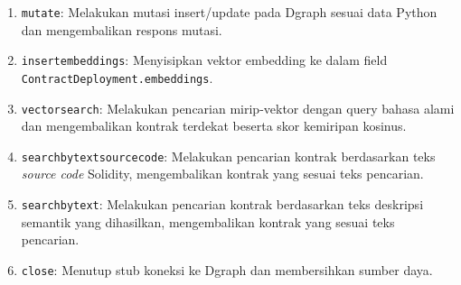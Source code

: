 \begin{enumerate}
	\item \texttt{mutate}: Melakukan mutasi insert/update pada Dgraph sesuai data Python dan mengembalikan respons mutasi.
	\item \texttt{insert\textunderscore embeddings}: Menyisipkan vektor embedding ke dalam field \\\texttt{ContractDeployment.embeddings}.
	\item \texttt{vector\textunderscore search}: Melakukan pencarian mirip-vektor dengan query bahasa alami dan mengembalikan kontrak terdekat beserta skor kemiripan kosinus.
	\item \texttt{search\textunderscore by\textunderscore text\textunderscore source\textunderscore code}: Melakukan pencarian kontrak berdasarkan teks \textit{source code} Solidity, mengembalikan kontrak yang sesuai teks pencarian.
	\item \texttt{search\textunderscore by\textunderscore text}: Melakukan pencarian kontrak berdasarkan teks deskripsi semantik yang dihasilkan, mengembalikan kontrak yang sesuai teks pencarian.
	\item \texttt{close}: Menutup stub koneksi ke Dgraph dan membersihkan sumber daya.
\end{enumerate}